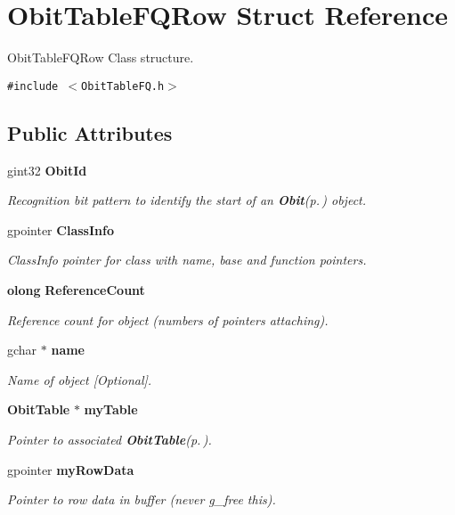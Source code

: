 \section{Obit\-Table\-FQRow Struct Reference}
\label{structObitTableFQRow}
Obit\-Table\-FQRow Class structure.  


{\tt \#include $<$Obit\-Table\-FQ.h$>$}

\subsection*{Public Attributes}
\begin{CompactItemize}
\item 
gint32 {\bf Obit\-Id}
\begin{CompactList}\small\item\em Recognition bit pattern to identify the start of an {\bf Obit}{\rm (p.\,\pageref{structObit})} object. \item\end{CompactList}\item 
gpointer {\bf Class\-Info}
\begin{CompactList}\small\item\em Class\-Info pointer for class with name, base and function pointers. \item\end{CompactList}\item 
{\bf olong} {\bf Reference\-Count}
\begin{CompactList}\small\item\em Reference count for object (numbers of pointers attaching). \item\end{CompactList}\item 
gchar $\ast$ {\bf name}
\begin{CompactList}\small\item\em Name of object [Optional]. \item\end{CompactList}\item 
{\bf Obit\-Table} $\ast$ {\bf my\-Table}
\begin{CompactList}\small\item\em Pointer to associated {\bf Obit\-Table}{\rm (p.\,\pageref{structObitTable})}. \item\end{CompactList}\item 
gpointer {\bf my\-Row\-Data}
\begin{CompactList}\small\item\em Pointer to row data in buffer (never g\_\-free this). \item\end{CompactList}\item 

\end{CompactItemize}
